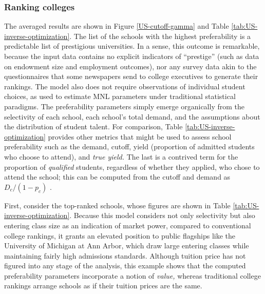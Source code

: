 \documentclass[12pt]{article}
\numberwithin{equation}{subsection}
\theoremstyle{definition}
\begin{document}
\subsubsection{Ranking colleges}
The averaged results are shown in Figure \ref{US-cutoff-gamma} and Table \ref{tab:US-inverse-optimization}. The list of the schools with the highest preferability is a predictable list of prestigious universities. In a sense, this outcome is remarkable, because the input data contains no explicit indicators of ``prestige'' (such as data on endowment size and employment outcomes), nor any survey data akin to the questionnaires that some newspapers send to college executives to generate their rankings. The model also does not require observations of individual student choices, as used to estimate MNL parameters under traditional statistical paradigms. The preferability parameters simply emerge organically from the selectivity of each school, each school's total demand, and the assumptions about the distribution of student talent. For comparison, Table \ref{tab:US-inverse-optimization} provides other metrics that might be used to assess school preferability such as the demand, cutoff, yield (proportion of admitted students who choose to attend), and \emph{true yield.} The last is a contrived term for the proportion of \emph{qualified} students, regardless of whether they applied, who chose to attend the school; this can be computed from the cutoff and demand as $D_c / (1- p_c)$ . 

First, consider the top-ranked schools, whose figures are shown in Table \ref{tab:US-inverse-optimization}. Because this model considers not only selectivity but also entering class size as an indication of market power, compared to conventional college rankings, it grants an elevated position to public flagships like the University of Michigan at Ann Arbor, which draw large entering classes while maintaining fairly high admissions standards. Although tuition price has not figured into any stage of the analysis, this example shows that the computed preferability parameters incorporate a notion of \emph{value,} whereas traditional college rankings arrange schools as if their tuition prices are the same.
\end{document}
